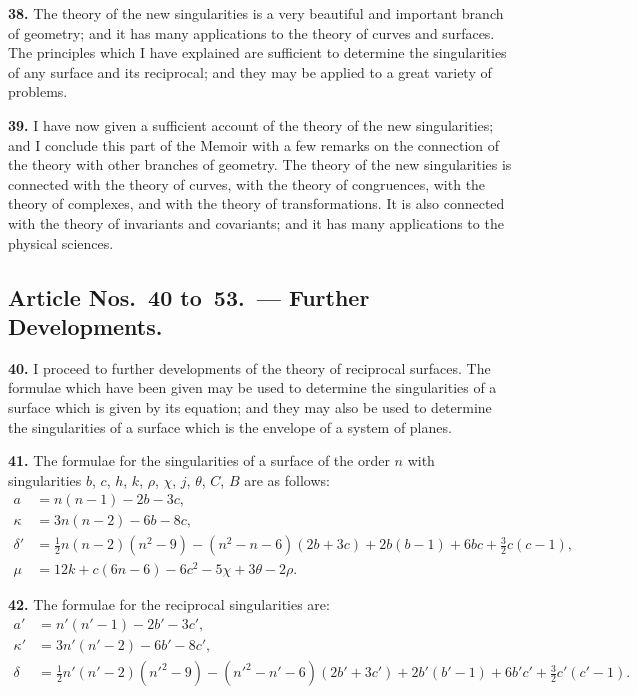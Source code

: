 \documentclass[11pt,a4paper]{article}
\begin{document}
\textbf{38.} The theory of the new singularities is a very beautiful and important branch of geometry; and it has many applications to the theory of curves and surfaces. The principles which I have explained are sufficient to determine the singularities of any surface and its reciprocal; and they may be applied to a great variety of problems.

\textbf{39.} I have now given a sufficient account of the theory of the new singularities; and I conclude this part of the Memoir with a few remarks on the connection of the theory with other branches of geometry. The theory of the new singularities is connected with the theory of curves, with the theory of congruences, with the theory of complexes, and with the theory of transformations. It is also connected with the theory of invariants and covariants; and it has many applications to the physical sciences.

\subsection*{Article Nos.~40 to~53.\ --- Further Developments.}

\textbf{40.} I proceed to further developments of the theory of reciprocal surfaces. The formulae which have been given may be used to determine the singularities of a surface which is given by its equation; and they may also be used to determine the singularities of a surface which is the envelope of a system of planes.

\textbf{41.} The formulae for the singularities of a surface of the order $n$ with singularities $b$, $c$, $h$, $k$, $\rho$, $\chi$, $j$, $\theta$, $C$, $B$ are as follows:
\begin{align*}
a &= n(n-1) - 2b - 3c, \\
\kappa &= 3n(n-2) - 6b - 8c, \\
\delta' &= \tfrac{1}{2}n(n-2)(n^2-9) - (n^2-n-6)(2b+3c) + 2b(b-1) + 6bc + \tfrac{3}{2}c(c-1), \\
\mu &= 12k + c(6n-6) - 6c^2 - 5\chi + 3\theta - 2\rho.
\end{align*}

\textbf{42.} The formulae for the reciprocal singularities are:
\begin{align*}
a' &= n'(n'-1) - 2b' - 3c', \\
\kappa' &= 3n'(n'-2) - 6b' - 8c', \\
\delta &= \tfrac{1}{2}n'(n'-2)(n'^2-9) - (n'^2-n'-6)(2b'+3c') + 2b'(b'-1) + 6b'c' + \tfrac{3}{2}c'(c'-1).
\end{align*}
\end{document}
